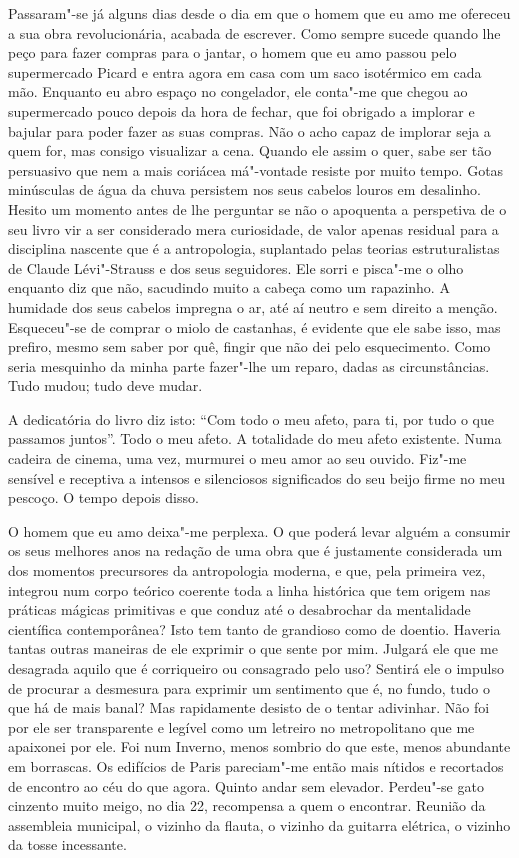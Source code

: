 Passaram"-se já alguns dias desde o dia em que o homem que eu amo me
ofereceu a sua obra revolucionária, acabada de escrever. Como sempre
sucede quando lhe peço para fazer compras para o jantar, o homem que eu
amo passou pelo supermercado Picard e entra agora em casa com um saco
isotérmico em cada mão. Enquanto eu abro espaço no congelador, ele
conta"-me que chegou ao supermercado pouco depois da hora de fechar, que
foi obrigado a implorar e bajular para poder fazer as suas compras. Não
o acho capaz de implorar seja a quem for, mas consigo visualizar a cena.
Quando ele assim o quer, sabe ser tão persuasivo que nem a mais coriácea má"-vontade resiste por muito tempo. Gotas minúsculas de água da
chuva persistem nos seus cabelos louros em desalinho. Hesito um momento
antes de lhe perguntar se não o apoquenta a perspetiva de o seu livro
vir a ser considerado mera curiosidade, de valor apenas residual para a
disciplina nascente que é a antropologia, suplantado pelas teorias
estruturalistas de Claude Lévi"-Strauss e dos seus seguidores. Ele sorri
e pisca"-me o olho enquanto diz que não, sacudindo muito a cabeça como um
rapazinho. A humidade dos seus cabelos impregna o ar, até aí neutro e
sem direito a menção. Esqueceu"-se de comprar o miolo de castanhas, é
evidente que ele sabe isso, mas prefiro, mesmo sem saber por quê, fingir
que não dei pelo esquecimento. Como seria mesquinho da minha parte
fazer"-lhe um reparo, dadas as circunstâncias. Tudo mudou; tudo deve mudar.

A dedicatória do livro diz isto: ``Com todo o meu afeto, para ti, por
tudo o que passamos juntos''. Todo o meu afeto.
A totalidade do meu afeto existente. Numa cadeira de cinema, uma vez,
murmurei o meu amor ao seu ouvido. Fiz"-me sensível e receptiva a
intensos e silenciosos significados do seu beijo firme no meu pescoço. O
tempo depois disso.

O homem que eu amo deixa"-me perplexa. O que poderá levar alguém a
consumir os seus melhores anos na redação de uma obra que é justamente
considerada um dos momentos precursores da antropologia moderna, e que,
pela primeira vez, integrou num corpo teórico coerente toda a linha
histórica que tem origem nas práticas mágicas primitivas e que conduz
até o desabrochar da mentalidade científica contemporânea? Isto tem
tanto de grandioso como de doentio. Haveria tantas outras maneiras de
ele exprimir o que sente por mim. Julgará ele que me desagrada aquilo
que é corriqueiro ou consagrado pelo uso? Sentirá ele o impulso de
procurar a desmesura para exprimir um sentimento que é, no fundo, tudo o
que há de mais banal? Mas rapidamente desisto de o tentar adivinhar. Não
foi por ele ser transparente e legível como um letreiro no metropolitano
que me apaixonei por ele. Foi num Inverno, menos sombrio do que este,
menos abundante em borrascas. Os edifícios de Paris pareciam"-me então
mais nítidos e recortados de encontro ao céu do que agora. Quinto andar
sem elevador. Perdeu"-se gato cinzento muito meigo, no dia 22, recompensa
a quem o encontrar. Reunião da assembleia municipal, o vizinho da
flauta, o vizinho da guitarra elétrica, o vizinho da tosse incessante.

